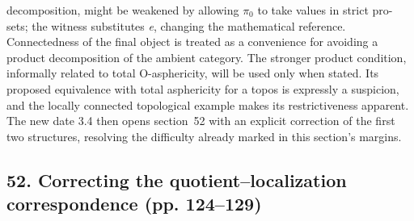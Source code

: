 \documentclass[10pt,oneside]{book}
\begin{document}
decomposition, might be weakened by allowing $\pi_0$ to take values in strict pro-sets; the witness substitutes \emph{e}, changing the mathematical reference. Connectedness of the final object is treated as a convenience for avoiding a product decomposition of the ambient category. The stronger product condition, informally related to total O-asphericity, will be used only when stated. Its proposed equivalence with total asphericity for a topos is expressly a suspicion, and the locally connected topological example makes its restrictiveness apparent. The new date 3.4 then opens section~52 with an explicit correction of the first two structures, resolving the difficulty already marked in this section's margins.

\subsection*{52. Correcting the quotient--localization correspondence (pp. 124--129)}
\end{document}
